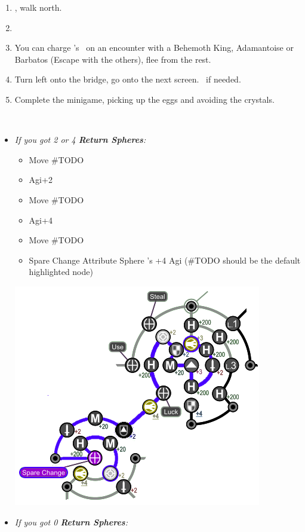 \begin{enumerate}[resume]
	\item \sd, walk north.
	\item \formation{\tidus}{\kimahri}{\auron}
	\item You can charge \rikku's \od\ on an encounter with a Behemoth King, Adamantoise or Barbatos (Escape with the others), flee from the rest.
	\item Turn left onto the bridge, go onto the next screen. \save\ if needed.
	\item Complete the minigame, picking up the eggs and avoiding the crystals.
\end{enumerate}
\bothvfill\winvfill\lossvfill
\ 
\colend
\begin{spheregrid}
	\begin{multicols}{2}
		\begin{itemize}
			\item \textit{If you got 2 or 4 \textbf{Return Spheres}:}
				\begin{itemize}
					\item Move #TODO
					\item Agi+2
					\item Move #TODO
					\item Agi+4
					\item Move #TODO
					\item Spare Change
					\yunaf Attribute Sphere \kimahri's +4 Agi (#TODO should be the default highlighted node)
				\end{itemize}
				\includegraphics[width=.8\columnwidth]{graphics/4_Return_final_grid}
			\item \textit{If you got 0 \textbf{Return Spheres}:}

\end{itemize}
\end{multicols}
\end{spheregrid}
